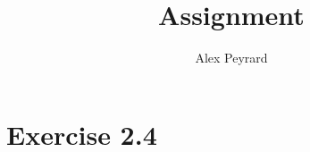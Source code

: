 \documentclass[10pt]{article}
\author{Alex Peyrard}
\title{Assignment}
\begin{document}
\maketitle
\section{Exercise 2.4}
\end{document}
